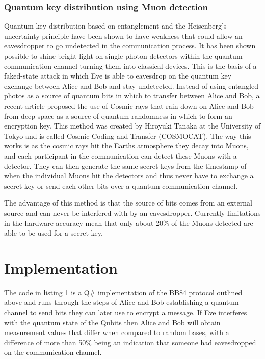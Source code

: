 \documentclass{article}
\begin{document}
\subsubsection{Quantum key distribution using Muon detection }
Quantum key distribution based on entanglement and the Heisenberg's uncertainty principle have been shown to have weakness that could allow an eavesdropper to go undetected in the communication process. It has been shown possible to shine bright light on single-photon detectors within the quantum communication channel turning them into classical devices. This is the basis of a faked-state attack \cite{Guskind2009ControllingLight} in which Eve is able to eavesdrop on the quantum key exchange between Alice and Bob and stay undetected.
Instead of using entangled photos as a source of quantum bits in which to transfer between Alice and Bob, a recent article \cite{Cartlidge2023MuonsSystem} proposed the use of Cosmic rays that rain down on Alice and Bob from deep space as a source of quantum randomness in which to form an encryption key. This method was created by Hiroyuki Tanaka at the University of Tokyo and is called Cosmic Coding and Transfer (COSMOCAT). The way this works is as the cosmic rays hit the Earths atmosphere they decay into Muons, and each participant in the communication can detect these Muons with a detector. They can then generate the same secret keys from the timestamp of when the individual Muons hit the detectors and thus never have to exchange a secret key or send each other bits over a quantum communication channel. 

The advantage of this method is that the source of bits comes from an external source and can never be interfered with by an eavesdropper. Currently limitations in the hardware accuracy mean that only about 20\% of the Muons detected are able to be used for a secret key.


\section{Implementation}

The code \cite{Dale2023Leedale1981/msc-applied-crypto-coursework:Code.} in listing 1 is a Q\# implementation of the BB84 protocol outlined above and runs through the steps of Alice and Bob establishing a quantum channel to send bits they can later use to encrypt a message. If Eve interferes with the quantum state of the Qubits then Alice and Bob will obtain measurement values that differ when compared to random bases, with a difference of more than 50\% being an indication that someone had eavesdropped on the communication channel.
\end{document}
